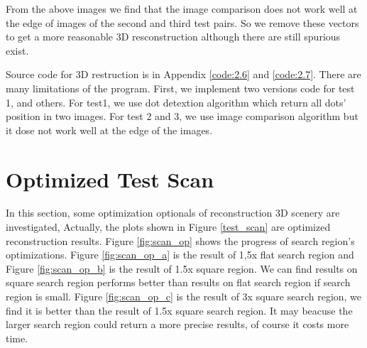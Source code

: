 From the above images we find that the image comparison does not work well at the edge of images of the second and third test pairs. So we remove these vectors to get a more reasonable 3D resconstruction although there are still spurious exist. 

Source code for 3D restruction is in Appendix \ref{code:2.6} and \ref{code:2.7}. There are many limitations of the program. First, we implement two versions code for test 1, and others. For test1, we use dot detextion algorithm which return all dots' position in two images. For test 2 and 3, we use image comparison algorithm but it dose not work well at the edge of the images. 


\section{Optimized Test Scan}

In this section, some optimization optionals of reconstruction 3D scenery are investigated, Actually, the plots shown in Figure \ref{test_scan} are optimized reconstruction results. Figure \ref{fig:scan_op} shows the progress of search region's optimizations. Figure \ref{fig:scan_op_a} is the result of 1,5x flat search region and Figure \ref{fig:scan_op_b} is the result of 1.5x square region. We can find results on square search region performs better than results on flat search region if search region is small. Figure \ref{fig:scan_op_c} is the result of 3x square search region, we find it is better than the result of 1.5x square search region. It may beacuse the larger search region could return a more precise results, of course it costs more time. 


